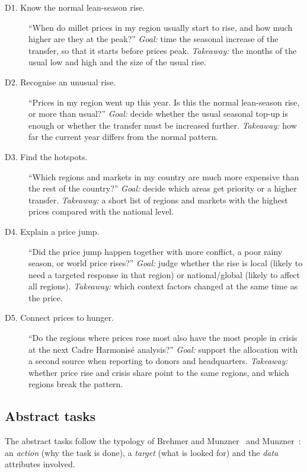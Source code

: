 \documentclass{article}
\begin{document}
\begin{description}
  \item[D1. Know the normal lean-season rise.] ``When do millet prices in my region usually start to rise, and how much higher are they at the peak?'' \emph{Goal:} time the seasonal increase of the transfer, so that it starts before prices peak. \emph{Takeaway:} the months of the usual low and high and the size of the usual rise.

  \item[D2. Recognise an unusual rise.] ``Prices in my region went up this year. Is this the normal lean-season rise, or more than usual?'' \emph{Goal:} decide whether the usual seasonal top-up is enough or whether the transfer must be increased further. \emph{Takeaway:} how far the current year differs from the normal pattern.

  \item[D3. Find the hotspots.] ``Which regions and markets in my country are much more expensive than the rest of the country?'' \emph{Goal:} decide which areas get priority or a higher transfer. \emph{Takeaway:} a short list of regions and markets with the highest prices compared with the national level.

  \item[D4. Explain a price jump.] ``Did the price jump happen together with more conflict, a poor rainy season, or world price rises?'' \emph{Goal:} judge whether the rise is local (likely to need a targeted response in that region) or national/global (likely to affect all regions). \emph{Takeaway:} which context factors changed at the same time as the price.

  \item[D5. Connect prices to hunger.] ``Do the regions where prices rose most also have the most people in crisis at the next Cadre Harmonis\'e analysis?'' \emph{Goal:} support the allocation with a second source when reporting to donors and headquarters. \emph{Takeaway:} whether price rise and crisis share point to the same regions, and which regions break the pattern.
\end{description}

\subsection{Abstract tasks}

The abstract tasks follow the typology of Brehmer and Munzner~\cite{brehmer2013} and Munzner~\cite{munzner2014}: an \emph{action} (why the task is done), a \emph{target} (what is looked for) and the \emph{data} attributes involved.
\end{document}
